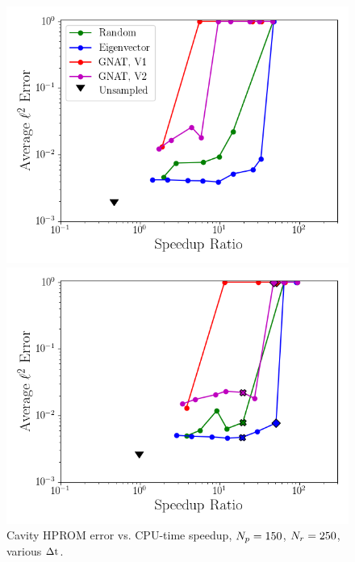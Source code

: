 \begin{figure}
	\begin{minipage}{0.49\linewidth}
		\includegraphics[width=0.99\linewidth]{Chapters/HPROMResults/Images/cavity/deim/sampled_dt2p5e-6_Average_errorRaw_pareto.png}
		\subcaption{$\dt = 2.5 \times \dtFOM$}
	\end{minipage}
	\begin{minipage}{0.49\linewidth}
		\includegraphics[width=0.99\linewidth]{Chapters/HPROMResults/Images/cavity/deim/sampled_dt5e-6_Average_errorRaw_pareto.png}
		\subcaption{$\dt = 5 \times \dtFOM$}
	\end{minipage}
	\caption{\label{fig:cavitySampledROMErrVsTime}Cavity HPROM error vs. CPU-time speedup, $N_p = 150$, $N_r = 250$, various $\Delta \text{t}$.}
\end{figure}

